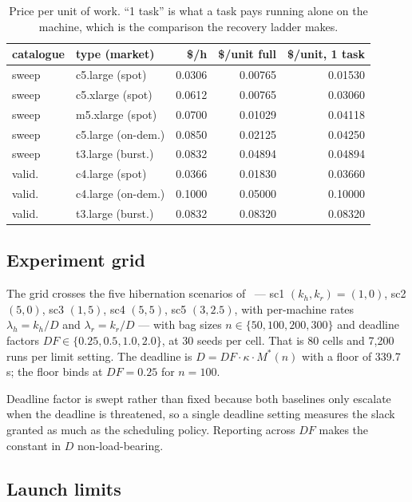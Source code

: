 \documentclass[conference]{IEEEtran}
\begin{document}
\begin{table}[!t]
\caption{Price per unit of work. ``1 task'' is what a task pays running alone
on the machine, which is the comparison the recovery ladder makes.}
\label{tab:catalogue}
\centering
\footnotesize
\setlength{\tabcolsep}{3.6pt}
\begin{tabular}{@{}llrrr@{}}
\toprule
catalogue & type (market) & \$/h & \$/unit full & \$/unit, 1 task \\
\midrule
sweep & c5.large (spot) & 0.0306 & 0.00765 & 0.01530 \\
sweep & c5.xlarge (spot) & 0.0612 & 0.00765 & 0.03060 \\
sweep & m5.xlarge (spot) & 0.0700 & 0.01029 & 0.04118 \\
sweep & c5.large (on-dem.) & 0.0850 & 0.02125 & 0.04250 \\
sweep & t3.large (burst.) & 0.0832 & 0.04894 & 0.04894 \\
\midrule
valid. & c4.large (spot) & 0.0366 & 0.01830 & 0.03660 \\
valid. & c4.large (on-dem.) & 0.1000 & 0.05000 & 0.10000 \\
valid. & t3.large (burst.) & 0.0832 & 0.08320 & 0.08320 \\
\bottomrule
\end{tabular}
\end{table}

\subsection{Experiment grid}

The grid crosses the five hibernation scenarios of~\cite[Table~9]{teylo2023} ---
sc1 $(k_h,k_r)=(1,0)$, sc2 $(5,0)$, sc3 $(1,5)$, sc4 $(5,5)$, sc5 $(3,2.5)$,
with per-machine rates $\lambda_h = k_h/D$ and $\lambda_r = k_r/D$ --- with bag
sizes $n \in \{50,100,200,300\}$ and deadline factors
$DF \in \{0.25, 0.5, 1.0, 2.0\}$, at 30 seeds per cell. That is 80 cells and
7{,}200 runs per limit setting. The deadline is
$D = DF \cdot \kappa \cdot M^{*}(n)$ with a floor of 339.7\,s; the floor binds at
$DF = 0.25$ for $n = 100$.

Deadline factor is swept rather than fixed because both baselines only escalate
when the deadline is threatened, so a single deadline setting measures the slack
granted as much as the scheduling policy. Reporting across $DF$ makes the
constant in $D$ non-load-bearing.

\subsection{Launch limits}
\end{document}
